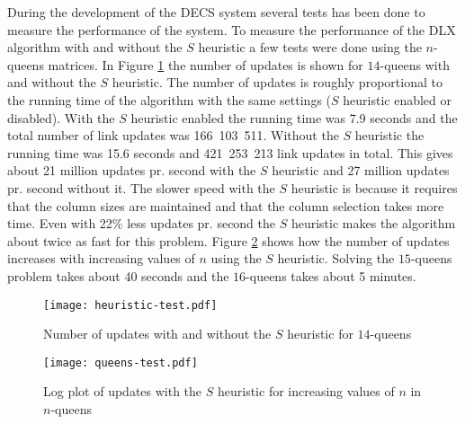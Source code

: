 During the development of the DECS system several tests has been done to measure the performance of the system.
To measure the performance of the DLX algorithm with and without the $S$ heuristic a few tests were done using the $n$-queens matrices.
In Figure \ref{fig:heuristic-test} the number of updates is shown for $14$-queens with and without the $S$ heuristic.
The number of updates is roughly proportional to the running time of the algorithm with the same settings ($S$ heuristic enabled or disabled).
With the $S$ heuristic enabled the running time was 7.9 seconds and the total number of link updates was 166~103~511.
Without the $S$ heuristic the running time was 15.6 seconds and 421~253~213 link updates in total.
This gives about 21 million updates pr. second with the $S$ heuristic and 27 million updates pr. second without it.
The slower speed with the $S$ heuristic is because it requires that the column sizes are maintained and that the column selection takes more time.
Even with 22\% less updates pr. second the $S$ heuristic makes the algorithm about twice as fast for this problem.
Figure \ref{fig:queens-test} shows how the number of updates increases with increasing values of $n$ using the $S$ heuristic.
Solving the $15$-queens problem takes about 40 seconds and the $16$-queens takes about 5 minutes.

\begin{figure}[htbp]
	\centering 
	\texttt{[image: heuristic-test.pdf]}
	\caption{Number of updates with and without the $S$ heuristic for $14$-queens}
	\label{fig:heuristic-test}
\end{figure}

\begin{figure}[htbp]
	\centering 
	\texttt{[image: queens-test.pdf]}
	\caption{Log plot of updates with the $S$ heuristic for increasing values of $n$ in $n$-queens}
	\label{fig:queens-test}
\end{figure}
